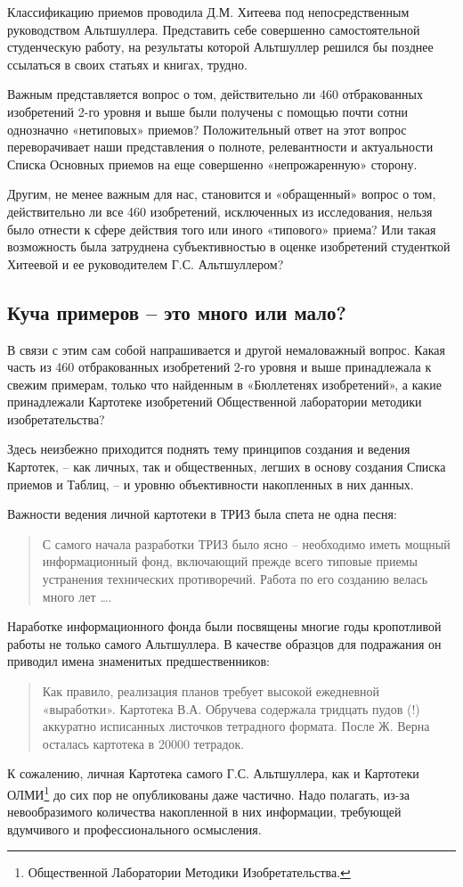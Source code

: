 \documentclass[11pt,a4paper]{article}
\begin{document}
Классификацию приемов проводила Д.М. Хитеева под непосредственным руководством
Альтшуллера. Представить себе совершенно самостоятельной студенческую работу,
на результаты которой Альтшуллер решился бы позднее ссылаться в своих статьях
и книгах, трудно.

Важным представляется вопрос о том, действительно ли 460 отбракованных
изобретений 2-го уровня и выше были получены с помощью почти сотни однозначно
«нетиповых» приемов? Положительный ответ на этот вопрос переворачивает наши
представления о полноте, релевантности и актуальности Списка Основных приемов
на еще совершенно «непрожаренную» сторону.

Другим, не менее важным для нас, становится и «обращенный» вопрос о том,
действительно ли все 460 изобретений, исключенных из исследования, нельзя было
отнести к сфере действия того или иного «типового» приема? Или такая
возможность была затруднена субъективностью в оценке изобретений студенткой
Хитеевой и ее руководителем Г.С. Альтшуллером?

\subsection*{Куча примеров -- это много или мало?}

В связи с этим сам собой напрашивается и другой немаловажный вопрос. Какая
часть из 460 отбракованных изобретений 2-го уровня и выше принадлежала к
свежим примерам, только что найденным в «Бюллетенях изобретений», а какие
принадлежали Картотеке изобретений Общественной лаборатории методики
изобретательства?

Здесь неизбежно приходится поднять тему принципов создания и ведения Картотек,
-- как личных, так и общественных, легших в основу создания Списка приемов и
Таблиц, -- и уровню объективности накопленных в них данных.

Важности ведения личной картотеки в ТРИЗ была спета не одна песня:
\begin{quote}
  С самого начала разработки ТРИЗ было ясно -- необходимо иметь мощный
  информационный фонд, включающий прежде всего типовые приемы устранения
  технических противоречий. Работа по его созданию велась много лет ….
  \cite[с. 165-230]{Altshuller1988}
\end{quote}
Наработке информационного фонда были посвящены многие годы кропотливой работы
не только самого Альтшуллера. В качестве образцов для подражания он приводил
имена знаменитых предшественников:
\begin{quote}
  Как правило, реализация планов требует высокой ежедневной «выработки».
  Картотека В.А. Обручева содержала тридцать пудов (!) аккуратно исписанных
  листочков тетрадного формата. После Ж. Верна осталась картотека в 20000
  тетрадок.  \cite{Altshuller1985a}
\end{quote}
К сожалению, личная Картотека самого Г.С. Альтшуллера, как и Картотеки
ОЛМИ\footnote{Общественной Лаборатории Методики Изобретательства.} до сих пор
не опубликованы даже частично. Надо полагать, из-за невообразимого количества
накопленной в них информации, требующей вдумчивого и профессионального
осмысления.
\end{document}
